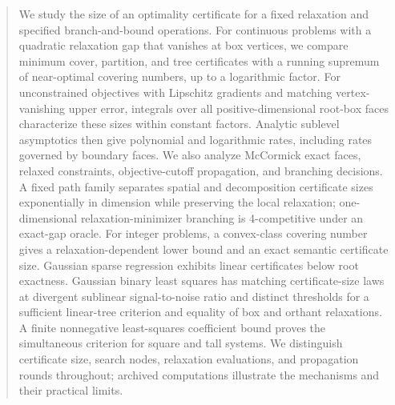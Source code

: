 \begin{abstract}
We study the size of an optimality certificate for a fixed relaxation and
specified branch-and-bound operations. For continuous problems with a
quadratic relaxation gap that vanishes at box vertices, we compare minimum
cover, partition, and tree certificates with a running supremum of
near-optimal covering numbers, up to a logarithmic factor. For unconstrained
objectives with Lipschitz gradients and matching vertex-vanishing upper
error, integrals over all positive-dimensional root-box faces characterize
these sizes within constant factors. Analytic sublevel asymptotics then give
polynomial and logarithmic rates, including rates governed by boundary
faces. We also analyze McCormick exact faces, relaxed constraints,
objective-cutoff propagation, and branching decisions. A fixed path family
separates spatial and decomposition certificate sizes exponentially in
dimension while preserving the local relaxation; one-dimensional
relaxation-minimizer branching is 4-competitive under an exact-gap oracle.
For integer problems, a convex-class covering number gives a
relaxation-dependent lower bound and an exact semantic certificate size.
Gaussian sparse regression exhibits linear certificates below root
exactness. Gaussian binary least squares has matching certificate-size laws
at divergent sublinear signal-to-noise ratio and distinct thresholds for a
sufficient linear-tree criterion and equality of box and orthant relaxations. A finite
nonnegative least-squares coefficient bound proves the simultaneous
criterion for square and tall systems. We distinguish certificate size,
search nodes, relaxation evaluations, and propagation rounds throughout;
archived computations illustrate the mechanisms and their practical limits.
\end{abstract}
